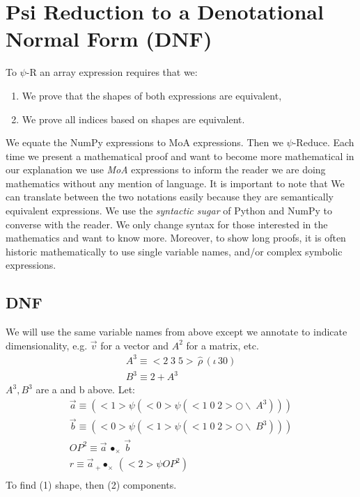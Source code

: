 \documentclass[a4paper,12pt]{article}
\newcommand{\reshape}{\,\widehat{\rho}\,}         %
\newcommand{\range}{\iota\,}                      %
\newcommand{\transpose}{\bigcirc\!\!\!\!\!\backslash\;} %
\newcommand{\vc}[1]{<#1>}                         %
\newcommand{\vccc}[3]{<#1\;#2\;#3>}               %
\newcommand{\outerprod}[1]{\,\bullet_{#1}\,}              %
\newcommand{\innerprod}[2]{\,{}_{#1}\!\!\bullet_{#2}\,}   %
\begin{document}
  

\section{Psi Reduction to a Denotational Normal Form (DNF)}
To $\psi$-R an array expression requires that we:
\begin{enumerate}
    \item We  prove that the shapes of both expressions are equivalent,
    \item We prove all indices based on shapes are equivalent.
\end{enumerate}


We equate the NumPy expressions to MoA expressions. Then we $\psi$-Reduce.
Each time we present a mathematical proof and want to become more mathematical in our explanation we use  {\em MoA} expressions to inform the reader we are doing mathematics without any mention of language. It is important to note that We can translate between the two notations easily  because they are semantically equivalent expressions. We use the {\em syntactic sugar} of Python and NumPy to  converse with the reader. We only change syntax for those interested in the mathematics and want to know more. Moreover, to show long proofs, it is often historic mathematically to use single variable names, and/or complex symbolic expressions.
\subsection{DNF}
We will use the same variable names from above except we annotate to indicate dimensionality, e.g. $\vec v$ for a vector and $A^2$ for a matrix, etc.
\begin{eqnarray}
A^3 \equiv \vccc235\reshape(\range30) \\
B^3 \equiv 2+A^3
\end{eqnarray}
$A^3,B^3$ are a and b above.
Let:
\begin{eqnarray}
\vec a \equiv (\vc1\psi( \vc0 \psi (\vccc102 \transpose A^3  ))) \\
\vec b \equiv (\vc0\psi( \vc1 \psi (\vccc102 \transpose B^3  )))\\
{OP}^2 \equiv \vec a \outerprod\times\vec b\\
r \equiv \vec a \innerprod+\times(\vc2 \psi {OP}^2)\\
\end{eqnarray}
To find (1) shape, then (2) components.
\end{document}
